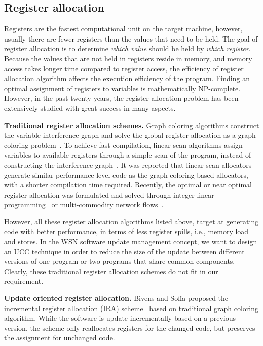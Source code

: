 \subsection{Register allocation}

Registers are the fastest computational unit on the target machine, however, usually there are fewer registers than the 
values that need to be held. The goal of register allocation is to determine {\it which value} should be held by {\it 
which register}. Because the values that are not held in registers reside in memory, and memory access takes longer 
time compared to register access, the efficiency of register allocation algorithm affects the execution efficiency of 
the program. 
Finding an optimal assignment of registers to variables is mathematically NP-complete. However, in the past twenty 
years, the register allocation problem has been extensively studied with great success in many aspects. 

\textbf{Traditional register allocation schemes.} 
Graph coloring algorithms construct the variable interference graph and solve the global register allocation as a graph 
coloring 
problem~\cite{related:graph-color,related:graph-color-improvements,related:graph-color-iterated,related:graph-color-priority}.
To achieve fast compilation, linear-scan algorithms assign variables to available registers through a simple 
scan of the program, instead of constructing the interference 
graph~\cite{related:linear-scan,related:linear-scan-fast}. It was reported that linear-scan allocators generate similar 
performance level code as the graph coloring-based allocators, with a shorter compilation time required. Recently, the 
optimal or near optimal register allocation was formulated and solved through integer linear 
programming~\cite{related:ilp,related:ilp-cisc,related:ilp-fast} or multi-commodity network 
flows~\cite{related:ilp-progressive}.

However, all these register allocation algorithms listed above, target at generating code with better performance, in 
terms of less register spills, i.e., memory load and stores. 
In the WSN software update management concept, we want to design an UCC technique in 
order to reduce the size of the update between different versions of one program or two programs that share common 
components. Clearly, these traditional register allocation schemes do not fit in our requirement.

\textbf{Update oriented register allocation.}
Bivens and Soffa proposed the incremental register allocation (IRA) scheme~\cite{related:ira} based on traditional 
graph coloring algorithm. While the software is update incrementally based on a previous version, the scheme only 
reallocates registers for the changed code, but preserves the assignment for unchanged code. 

